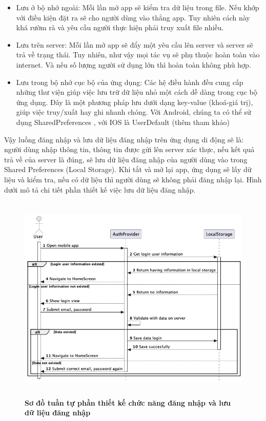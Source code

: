 \begin{itemize}
  \item Lưu ở bộ nhớ ngoài: Mỗi lần mở app sẽ kiểm tra dữ liệu trong file. Nếu khớp với điều kiện đặt ra sẽ cho người dùng vào thẳng app.
  Tuy nhiên cách này khá rườm rà và yêu cầu người thực hiện phải truy xuất file nhiều.
  \item Lưu trên server: Mỗi lần mở app sẽ đẩy một yêu cầu lên server và server sẽ trả về trạng thái. Tuy nhiên, như vậy mọi tác
  vụ sẽ phụ thuộc hoàn toàn vào internet. Và nếu số lượng người sử dụng lớn thì hoàn toàn không phù hợp.
  \item Lưu trong bộ nhớ cục bộ của ứng dụng: Các hệ điều hành đều cung cấp những thư viện giúp việc lưu trữ dữ liệu nhỏ một cách 
  dễ dàng trong cục bộ ứng dụng. Đây là một phương pháp lưu dưới dạng key-value (khoá-giá trị), giúp việc truy/xuất hay ghi nhanh chóng.
  Với Android, chúng ta có thể sử dụng SharedPreferences \cite{intro_sharedpref}, với IOS là UserDefault (thêm tham khảo)

\end{itemize}
Vậy luồng đăng nhập và lưu dữ liệu đăng nhập trên ứng dụng di động sẽ là: người dùng nhập thông tin, thông tin được gửi lên server xác thực,
nếu kết quả trả về của server là đúng, sẽ lưu dữ liệu đăng nhập của người dùng vào trong Shared Preferences (Local Storage). Khi tắt và mở lại app,
ứng dụng sẽ lấy dữ liệu và kiểm tra, nếu có dữ liệu thì người dùng sẽ không phải đăng nhập lại. Hình dưới mô tả chi tiết phần thiết
kế việc lưu dữ liệu đăng nhập.

\begin{figure}[H]
  \centering
  \includegraphics[width=16cm,height=10cm]{Images/mobile_app/design_store_data_login.png}
  \caption[Sơ đồ tuần tự phần thiết kế chức năng đăng nhập và lưu dữ liệu đăng nhập]{\bfseries \fontsize{12pt}{0pt}
  \selectfont Sơ đồ tuần tự phần thiết kế chức năng đăng nhập và lưu dữ liệu đăng nhập}
  \label{seq_auth} %
\end{figure}

